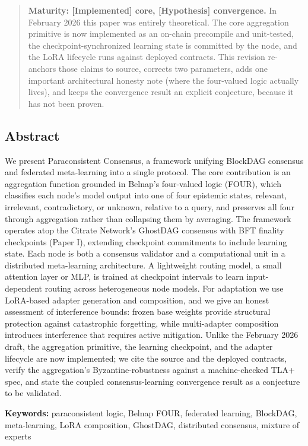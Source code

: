 \begin{quote}
\textbf{Maturity: {[}Implemented{]} core, {[}Hypothesis{]} convergence.}
In February 2026 this paper was entirely theoretical. The core
aggregation primitive is now implemented as an on-chain precompile and
unit-tested, the checkpoint-synchronized learning state is committed by
the node, and the LoRA lifecycle runs against deployed contracts. This
revision re-anchors those claims to source, corrects two parameters,
adds one important architectural honesty note (where the four-valued
logic actually lives), and keeps the convergence result an explicit
conjecture, because it has not been proven.
\end{quote}

\subsection{Abstract}\label{abstract}

We present Paraconsistent Consensus, a framework unifying BlockDAG
consensus and federated meta-learning into a single protocol. The core
contribution is an aggregation function grounded in Belnap's four-valued
logic (FOUR), which classifies each node's model output into one of four
epistemic states, relevant, irrelevant, contradictory, or unknown,
relative to a query, and preserves all four through aggregation rather
than collapsing them by averaging. The framework operates atop the
Citrate Network's GhostDAG consensus with BFT finality checkpoints
(Paper I), extending checkpoint commitments to include learning state.
Each node is both a consensus validator and a computational unit in a
distributed meta-learning architecture. A lightweight routing model, a
small attention layer or MLP, is trained at checkpoint intervals to
learn input-dependent routing across heterogeneous node models. For
adaptation we use LoRA-based adapter generation and composition, and we
give an honest assessment of interference bounds: frozen base weights
provide structural protection against catastrophic forgetting, while
multi-adapter composition introduces interference that requires active
mitigation. Unlike the February 2026 draft, the aggregation primitive,
the learning checkpoint, and the adapter lifecycle are now implemented;
we cite the source and the deployed contracts, verify the aggregation's
Byzantine-robustness against a machine-checked TLA+ spec, and state the
coupled consensus-learning convergence result as a conjecture to be
validated.

\textbf{Keywords:} paraconsistent logic, Belnap FOUR, federated
learning, BlockDAG, meta-learning, LoRA composition, GhostDAG,
distributed consensus, mixture of experts

